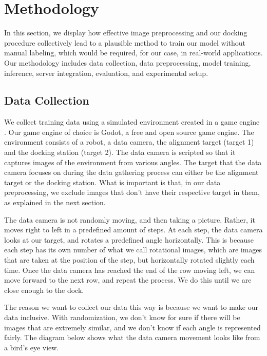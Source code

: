 \section{Methodology}
In this section, we display how effective image preprocessing and our docking procedure collectively lead to a plausible method to train our model without manual labeling, which would be required, for our case, in real-world applications. Our methodology includes data collection, data preprocessing, model training, inference, server integration, evaluation, and experimental setup.

\subsection{Data Collection}
We collect training data using a simulated environment created in a game engine \citep{hoster2024usinggameenginesmachine}. Our game engine of choice is Godot, a free and open source game engine. The environment consists of a robot, a data camera, the alignment target (target 1) and the docking station (target 2). The data camera is scripted so that it captures images of the environment from various angles. The target that the data camera focuses on during the data gathering process can either be the alignment target or the docking station. What is important is that, in our data preprocessing, we exclude images that don't have their respective target in them, as explained in the next section.

The data camera is not randomly moving, and then taking a picture. Rather, it moves right to left in a predefined amount of steps. At each step, the data camera looks at our target, and rotates a predefined angle horizontally. This is because each step has its own number of what we call rotational images, which are images that are taken at the position of the step, but horizontally rotated slightly each time. Once the data camera has reached the end of the row moving left, we can move forward to the next row, and repeat the process. We do this until we are close enough to the dock.


The reason we want to collect our data this way is because we want to make our data inclusive. With randomization, we don't know for sure if there will be images that are extremely similar, and we don't know if each angle is represented fairly. The diagram below shows what the data camera movement looks like from a bird's eye view.


